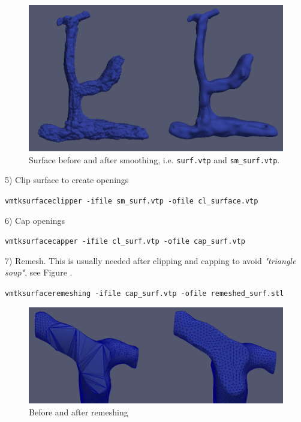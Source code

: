 \documentclass[epsfig,11pt]{article}
\begin{document}
\begin{figure}[h!] 
\begin{center}
  \includegraphics[scale=0.3]{smoothing.png}
  \end{center}
  \caption{Surface before and after smoothing, i.e. \texttt{surf.vtp} and \texttt{sm\_surf.vtp}.}
\end{figure}

5) Clip surface to create openings
\begin{framed}       
    \texttt{vmtksurfaceclipper -ifile sm\_surf.vtp -ofile cl\_surface.vtp}
\end{framed}
6) Cap openings 
\begin{framed}    
\texttt{vmtksurfacecapper -ifile cl\_surf.vtp -ofile cap\_surf.vtp}
\end{framed}
7) Remesh. This is usually needed after clipping and capping to avoid \emph{"triangle soup"}, see Figure 	. 
\begin{framed}    
\texttt{vmtksurfaceremeshing -ifile cap\_surf.vtp -ofile remeshed\_surf.stl}
\end{framed}

\begin{figure}[h!] 
\begin{center}
  \includegraphics[scale=0.3]{remsh.png}
  \end{center}
  \caption{Before and after remeshing}
\end{figure}
\end{document}
